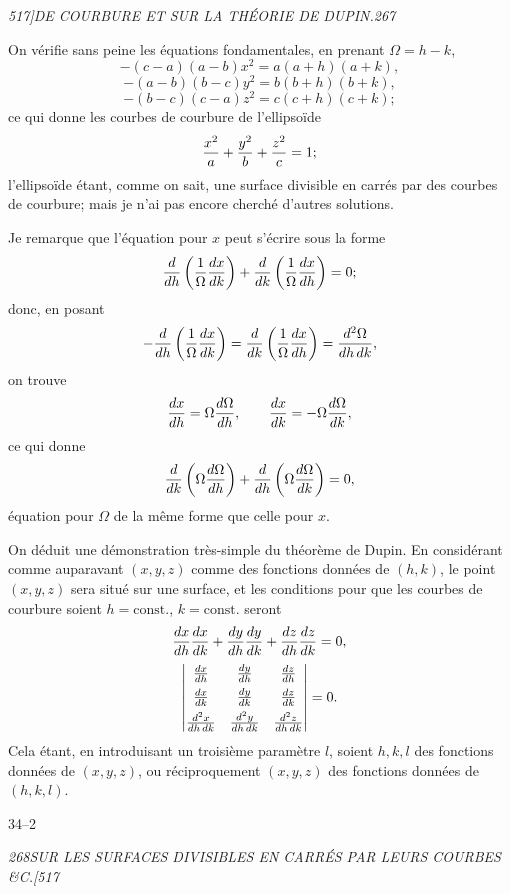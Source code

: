 \documentclass[11pt]{article}
\newcommand{\phead}[3]{\noindent\textit{#1\hfill #2\hfill #3}\par\medskip}
\begin{document}
\small
{}
\setcounter{page}{267}

\phead{517]}{DE COURBURE ET SUR LA TH\'EORIE DE DUPIN.}{267}

On v\'erifie sans peine les \'equations fondamentales, en prenant $\Omega=h-k$,
\[
-(c-a)(a-b)x^2=a(a+h)(a+k),
\]
\[
-(a-b)(b-c)y^2=b(b+h)(b+k),
\]
\[
-(b-c)(c-a)z^2=c(c+h)(c+k);
\]
ce qui donne les courbes de courbure de l'ellipso\"ide
\[
{x^2\over a}+{y^2\over b}+{z^2\over c}=1;
\]
l'ellipso\"ide \'etant, comme on sait, une surface divisible en carr\'es par des courbes de
courbure; mais je n'ai pas encore cherch\'e d'autres solutions.

Je remarque que l'\'equation pour $x$ peut s'\'ecrire sous la forme
\[
 {d\over dh}\left({1\over\Omega}{dx\over dk}\right)
+{d\over dk}\left({1\over\Omega}{dx\over dh}\right)=0;
\]
donc, en posant
\[
 -{d\over dh}\left({1\over\Omega}{dx\over dk}\right)
 ={d\over dk}\left({1\over\Omega}{dx\over dh}\right)
 ={d^2\Omega\over dh\,dk},
\]
on trouve
\[
 {dx\over dh}=\Omega {d\Omega\over dh},\qquad
 {dx\over dk}=-\Omega {d\Omega\over dk},
\]
ce qui donne
\[
 {d\over dk}\left(\Omega {d\Omega\over dh}\right)
+{d\over dh}\left(\Omega {d\Omega\over dk}\right)=0,
\]
\'equation pour $\Omega$ de la m\^eme forme que celle pour $x$.

On d\'eduit une d\'emonstration tr\`es-simple du th\'eor\`eme de Dupin. En consid\'erant
comme auparavant $(x,y,z)$ comme des fonctions donn\'ees de $(h,k)$, le point $(x,y,z)$
sera situ\'e sur une surface, et les conditions pour que les courbes de courbure soient
$h=\mathrm{const.}$, $k=\mathrm{const.}$ seront
\[
{dx\over dh}{dx\over dk}+{dy\over dh}{dy\over dk}+{dz\over dh}{dz\over dk}=0,
\]
\[
\begin{vmatrix}
 {dx\over dh}&{dy\over dh}&{dz\over dh}\\[4pt]
 {dx\over dk}&{dy\over dk}&{dz\over dk}\\[4pt]
 {d^2x\over dh\,dk}&{d^2y\over dh\,dk}&{d^2z\over dh\,dk}
\end{vmatrix}=0.
\]
Cela \'etant, en introduisant un troisi\`eme param\`etre $l$, soient $h,k,l$ des fonctions
donn\'ees de $(x,y,z)$, ou r\'eciproquement $(x,y,z)$ des fonctions donn\'ees de $(h,k,l)$.

\hfill 34--2
\clearpage

\phead{268}{SUR LES SURFACES DIVISIBLES EN CARR\'ES PAR LEURS COURBES \&C.}{[517}
\end{document}
